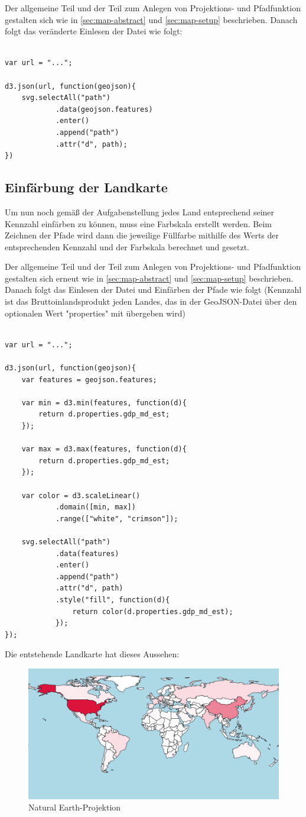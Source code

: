 Der allgemeine Teil und der Teil zum Anlegen von Projektions- und Pfadfunktion gestalten sich wie in \ref{sec:map-abstract} und \ref{sec:map-setup} beschrieben. Danach folgt das veränderte Einlesen der Datei wie folgt:

\begin{lstlisting}

var url = "...";

d3.json(url, function(geojson){
    svg.selectAll("path")
            .data(geojson.features)
            .enter()
            .append("path")
            .attr("d", path);
})

\end{lstlisting}

\subsection{Einfärbung der Landkarte}

Um nun noch gemäß der Aufgabenstellung jedes Land entsprechend seiner Kennzahl einfärben zu können, muss eine Farbskala erstellt werden. Beim Zeichnen der Pfade wird dann die jeweilige Füllfarbe mithilfe des Werts der entsprechenden Kennzahl und der Farbskala berechnet und gesetzt.

Der allgemeine Teil und der Teil zum Anlegen von Projektions- und Pfadfunktion gestalten sich erneut wie in \ref{sec:map-abstract} und \ref{sec:map-setup} beschrieben. Danach folgt das Einlesen der Datei und Einfärben der Pfade wie folgt (Kennzahl ist das Bruttoinlandsprodukt jeden Landes, das in der GeoJSON-Datei über den optionalen Wert "properties" mit übergeben wird)

\begin{lstlisting}

var url = "...";

d3.json(url, function(geojson){
    var features = geojson.features;

    var min = d3.min(features, function(d){
        return d.properties.gdp_md_est;
    });

    var max = d3.max(features, function(d){
        return d.properties.gdp_md_est;
    });

    var color = d3.scaleLinear()
            .domain([min, max])
            .range(["white", "crimson"]);

    svg.selectAll("path")
            .data(features)
            .enter()
            .append("path")
            .attr("d", path)
            .style("fill", function(d){
                return color(d.properties.gdp_md_est);
            });
});

\end{lstlisting}

Die entstehende Landkarte hat dieses Aussehen:

\begin{figure}[H]
    \centering
    
    \includegraphics[width=.5\textwidth]{images/mapChoreopleth}
    \caption{\glqq Natural Earth\grqq -Projektion}
\end{figure}